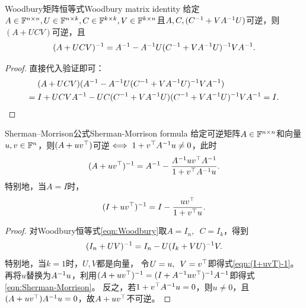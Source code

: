 ~

\begin{theorem}
	{Woodbury矩阵恒等式}{Woodbury matrix identity}
	给定$A \in \mathbb{F}^{n\times n},U \in \mathbb{F}^{n\times k},C \in \mathbb{F}^{k\times k},V \in \mathbb{F}^{k\times n}$且$A,C,(C^{-1} + VA^{-1} U)$可逆，则$(A + UCV)$可逆，且
	\begin{equation}
		\label{eqn:Woodbury}
		(A + UCV)^{-1} = A^{-1} - A^{-1} U(C^{-1} + VA^{-1} U)^{-1} VA^{-1}.
	\end{equation}
\end{theorem}
\begin{proof}
	直接代入验证即可：
	\begin{align*}
		&(A + UCV)(A^{-1} - A^{-1} U(C^{-1} + VA^{-1} U)^{-1} VA^{-1})\\
		= {}&I + UCVA^{-1} - UC(C^{-1} + VA^{-1} U)(C^{-1} + VA^{-1} U)^{-1} VA^{-1} = I.
		\qedhere
	\end{align*}
\end{proof}

\begin{theorem}
	{Sherman--Morrison公式}{Sherman-Morrison formula}
	给定可逆矩阵$A \in \mathbb{F}^{n\times n}$和向量$u,v \in \mathbb{F}^n$，则$(A + uv^\top)$可逆$\iff 1 + v^\top A^{-1} u \neq 0$，此时
	\begin{equation}
		\label{eqn:Sherman-Morrison}
		(A + uv^\top)^{-1} = A^{-1} - \frac{A^{-1} uv^\top A^{-1}}{1 + v^\top A^{-1} u}.
	\end{equation}
	特别地，当$A = I$时，
	\begin{equation}
		\label{eqn:(I+uvT)-1}
		(I + uv^\top)^{-1} = I - \frac{uv^\top}{1 + v^\top u}.
	\end{equation}
\end{theorem}
\begin{proof}
	对Woodbury恒等式\eqref{eqn:Woodbury}取$A = I_n,\enspace C = I_k$，得到
	\begin{equation}
		\label{eqn:(I+UVT)-1}
		(I_n + UV)^{-1} = I_n - U(I_k + VU)^{-1} V.
	\end{equation}
	特别地，当$k = 1$时，$U,V$都是向量，
	令$U = u,\enspace V = v^\top$即得式\eqref{eqn:(I+uvT)-1}。再将$u$替换为$A^{-1} u$，利用$(A + uv^\top)^{-1} = (I + A^{-1} uv^\top)^{-1} A^{-1}$即得式\eqref{eqn:Sherman-Morrison}。
	反之，若$1 + v^\top A^{-1} u = 0$，则$u \neq 0$，且$(A + uv^\top)A^{-1} u = 0$，故$A + uv^\top$不可逆。
\end{proof}

